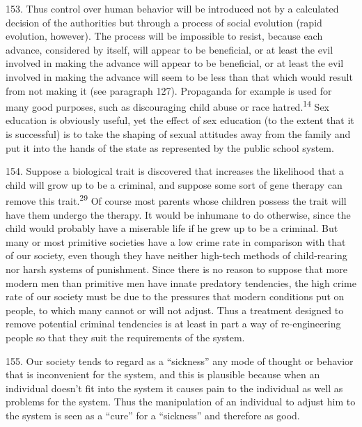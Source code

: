\documentclass{article}
\begin{document}
153. Thus control over human behavior will be introduced not by a calculated decision of the 
authorities but through a process of social evolution (rapid evolution, however). The process will 
be impossible to resist, because each advance, considered by itself, will appear to be beneficial, or 
at least the evil involved in making the advance will appear to be beneficial, or at least the evil 
involved in making the advance will seem to be less than that which would result from not making 
it (see paragraph 127). Propaganda for example is used for many good purposes, such as 
discouraging child abuse or race hatred.\textsuperscript{14} Sex education is obviously useful, yet the effect of 
sex education (to the extent that it is successful) is to take the shaping of sexual attitudes away 
from the family and put it into the hands of the state as represented by the public school system. \vspace{\baselineskip}

154. Suppose a biological trait is discovered that increases the likelihood that a child will grow up 
to be a criminal, and suppose some sort of gene therapy can remove this trait.\textsuperscript{29} Of course most 
parents whose children possess the trait will have them undergo the therapy. It would be inhumane 
to do otherwise, since the child would probably have a miserable life if he grew up to be a 
criminal. But many or most primitive societies have a low crime rate in comparison with that of 
our society, even though they have neither high-tech methods of child-rearing nor harsh systems 
of punishment. Since there is no reason to suppose that more modern men than primitive men 
have innate predatory tendencies, the high crime rate of our society must be due to the pressures 
that modern conditions put on people, to which many cannot or will not adjust. Thus a treatment 
designed to remove potential criminal tendencies is at least in part a way of re-engineering people 
so that they suit the requirements of the system. \vspace{\baselineskip}

155. Our society tends to regard as a “sickness” any mode of thought or behavior that is 
inconvenient for the system, and this is plausible because when an individual doesn’t fit into the 
system it causes pain to the individual as well as problems for the system. Thus the manipulation 
of an individual to adjust him to the system is seen as a “cure” for a “sickness” and therefore as 
good. \vspace{\baselineskip}
\end{document}
